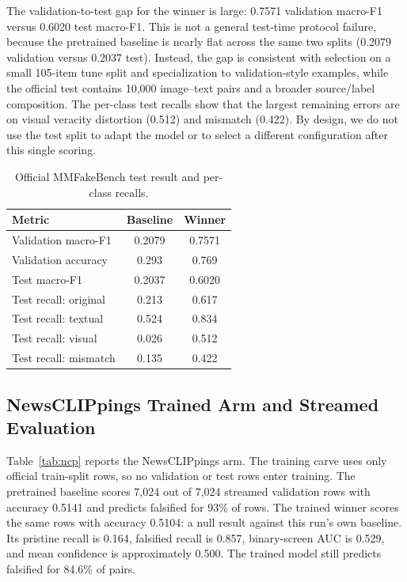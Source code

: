 \documentclass{article} %
\begin{document}
The validation-to-test gap for the winner is large: 0.7571 validation macro-F1 versus 0.6020 test macro-F1. This is not a general test-time protocol failure, because the pretrained baseline is nearly flat across the same two splits (0.2079 validation versus 0.2037 test). Instead, the gap is consistent with selection on a small 105-item tune split and specialization to validation-style examples, while the official test contains 10,000 image--text pairs and a broader source/label composition. The per-class test recalls show that the largest remaining errors are on visual veracity distortion (0.512) and mismatch (0.422). By design, we do not use the test split to adapt the model or to select a different configuration after this single scoring.

\begin{table}[t]
\centering
\small
\caption{Official MMFakeBench test result and per-class recalls.}
\label{tab:mmfake}
\begin{tabular}{lcc}
\toprule
Metric & Baseline & Winner \\
\midrule
Validation macro-F1 & 0.2079 & 0.7571 \\
Validation accuracy & 0.293 & 0.769 \\
Test macro-F1 & 0.2037 & 0.6020 \\
\midrule
Test recall: original & 0.213 & 0.617 \\
Test recall: textual & 0.524 & 0.834 \\
Test recall: visual & 0.026 & 0.512 \\
Test recall: mismatch & 0.135 & 0.422 \\
\bottomrule
\end{tabular}
\end{table}

\subsection{NewsCLIPpings Trained Arm and Streamed Evaluation}
Table~\ref{tab:ncp} reports the NewsCLIPpings arm. The training carve uses only official train-split rows, so no validation or test rows enter training. The pretrained baseline scores 7,024 out of 7,024 streamed validation rows with accuracy 0.5141 and predicts falsified for 93\% of rows. The trained winner scores the same rows with accuracy 0.5104: a null result against this run's own baseline. Its pristine recall is 0.164, falsified recall is 0.857, binary-screen AUC is 0.529, and mean confidence is approximately 0.500. The trained model still predicts falsified for 84.6\% of pairs.
\end{document}
